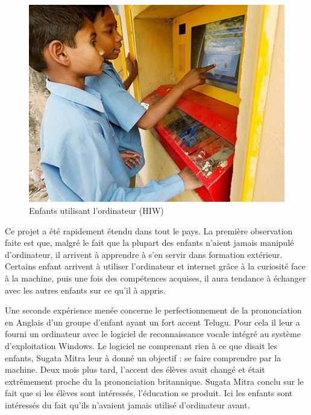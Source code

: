 \begin{minipage}[H]{.45\linewidth}
  \begin{figure}[H]
    \centering
    \includegraphics[width=\textwidth]{../resources/illustrations/hiw_3}
    \caption{Enfants utilisant l'ordinateur (\gls{HIW})}
  \end{figure}
\end{minipage}

Ce projet a été rapidement étendu dans tout le pays. La première observation faite est que, malgré le fait que la plupart des enfants n'aient jamais manipulé d'ordinateur, il arrivent à apprendre à s'en servir dans formation extérieur. Certains enfant arrivent à utiliser l'ordinateur et internet grâce à la curiosité face à la machine, puis une fois des compétences acquises, il aura tendance à échanger avec les autres enfants sur ce qu'il à appris.

Une seconde expérience menée concerne le perfectionnement de la prononciation en Anglais d'un groupe d'enfant ayant un fort accent Telugu. Pour cela il leur a fourni  un ordinateur avec le logiciel de reconnaissance vocale intégré au système d'exploitation Windows. Le logiciel ne comprenant rien à ce que disait les enfants, Sugata Mitra leur à donné un objectif : se faire comprendre par la machine. Deux mois plus tard, l'accent des élèves avait changé et était extrêmement proche du la prononciation britannique. Sugata Mitra conclu sur le fait que si les élèves sont intéressés, l'éducation se produit. Ici les enfants sont intéressés du fait qu'ils n'avaient jamais utilisé d'ordinateur avant.

